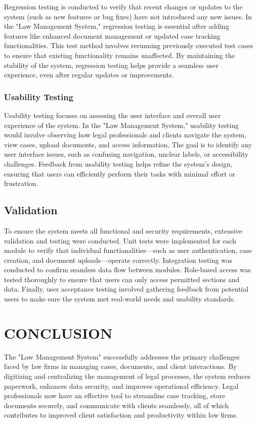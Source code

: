 Regression testing is conducted to verify that recent changes or updates to the system (such as new features or bug fixes) have not introduced any new issues. In the "Law Management System," regression testing is essential after adding features like enhanced document management or updated case tracking functionalities. This test method involves rerunning previously executed test cases to ensure that existing functionality remains unaffected. By maintaining the stability of the system, regression testing helps provide a seamless user experience, even after regular updates or improvements.

\subsection{Usability Testing}

Usability testing focuses on assessing the user interface and overall user experience of the system. In the "Law Management System," usability testing would involve observing how legal professionals and clients navigate the system, view cases, upload documents, and access information. The goal is to identify any user interface issues, such as confusing navigation, unclear labels, or accessibility challenges. Feedback from usability testing helps refine the system’s design, ensuring that users can efficiently perform their tasks with minimal effort or frustration.
\section{Validation}
%
To ensure the system meets all functional and security requirements, extensive validation and testing were conducted. Unit tests were implemented for each module to verify that individual functionalities—such as user authentication, case creation, and document uploads—operate correctly. Integration testing was conducted to confirm seamless data flow between modules. Role-based access was tested thoroughly to ensure that users can only access permitted sections and data. Finally, user acceptance testing involved gathering feedback from potential users to make sure the system met real-world needs and usability standards.
\chapter{CONCLUSION}
%
The "Law Management System" successfully addresses the primary challenges faced by law firms in managing cases, documents, and client interactions. By digitizing and centralizing the management of legal processes, the system reduces paperwork, enhances data security, and improves operational efficiency. Legal professionals now have an effective tool to streamline case tracking, store documents securely, and communicate with clients seamlessly, all of which contributes to improved client satisfaction and productivity within law firms.
